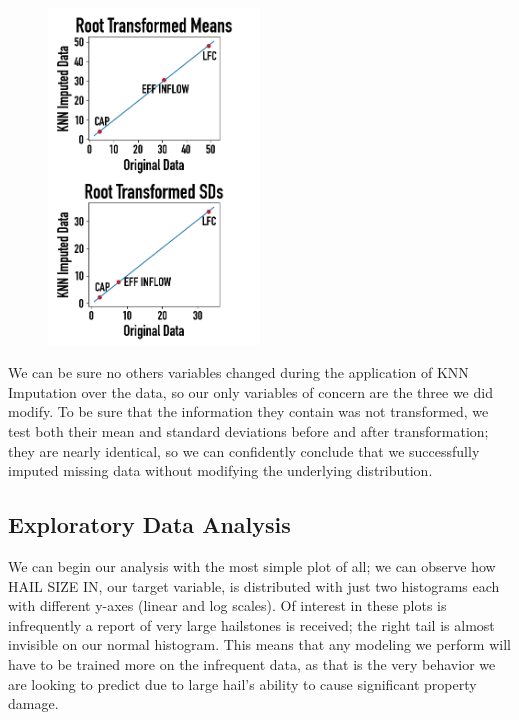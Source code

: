 \documentclass[fleqn,10pt]{SelfArx} %
\begin{document}
\begin{figure}[H]
\includegraphics[width=0.5\textwidth, center=8.5cm]{"plots/imputation_plot.png"} 
\end{figure}

\newpage

We can be sure no others variables changed during the application of KNN Imputation over the data, so our only variables of concern are the three we did modify. To be sure that the information they contain was not transformed, we test both their mean and standard deviations before and after transformation; they are nearly identical, so we can confidently conclude that we successfully imputed missing data without modifying the underlying distribution.

\subsection{Exploratory Data Analysis}

We can begin our analysis with the most simple plot of all; we can observe how HAIL SIZE IN, our target variable, is distributed with just two histograms each with different y-axes (linear and log scales). Of interest in these plots is infrequently a report of very large hailstones is received; the right tail is almost invisible on our normal histogram. This means that any modeling we perform will have to be trained more on the infrequent data, as that is the very behavior we are looking to predict due to large hail's ability to cause significant property damage.
\end{document}
